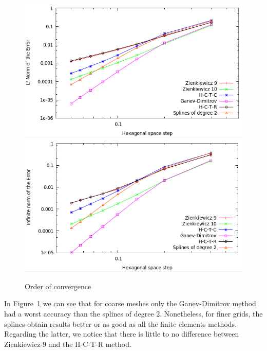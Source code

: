 \documentclass[proc]{edpsmath}
\begin{document}
\begin{figure}[h!]
	\label{fig:circ_convergence}
	\includegraphics[scale=0.35]{figures/l2.png}
	\includegraphics[scale=0.35]{figures/inf_l.png}
	\caption{Order of convergence}
\end{figure}

In Figure~\ref{fig:circ_convergence} we can see that for coarse meshes only the Ganev-Dimitrov method had a worst accuracy than the splines of degree $2$. Nonetheless, for finer grids, the splines obtain results better or as good as all the finite elements methods. Regarding the latter, we notice that there is little to no difference between Zienkiewicz-9 and the H-C-T-R method. 
\end{document}
